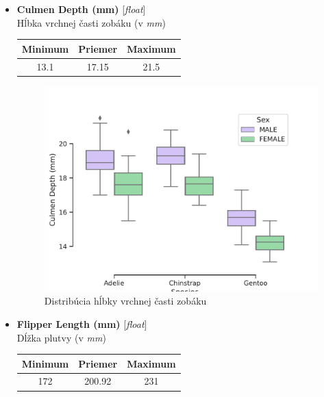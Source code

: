 \documentclass[a4paper, 16pt]{article}
\begin{document}
\begin{itemize}
    \item \textbf{Culmen Depth (mm)} [\emph{float}]\\
    Hĺbka vrchnej časti zobáku (v \emph{mm})
    \begin{table}[H]
        \centering
        \begin{tabular}{|c|c|c|}
        \hline
        \textbf{Minimum} & \textbf{Priemer} & \textbf{Maximum} \\ \hline
                          13.1    &      17.15            &   21.5                    \\ \hline
        \end{tabular}
    \end{table}
    
    \begin{figure}[H]
    \centering
    \includegraphics[width=15cm]{graphs/culmen_d.pdf}
    \caption{Distribúcia hĺbky vrchnej časti zobáku}
    \label{fig:2}
    \end{figure}
    
    
    \newpage
    
    
    \item \textbf{Flipper Length (mm)} [\emph{float}]\\
    Dĺžka plutvy (v \emph{mm})
    \begin{table}[H]
    \centering
    \begin{tabular}{|c|c|c|}
    \hline
    \textbf{Minimum} & \textbf{Priemer} & \textbf{Maximum} \\ \hline
                  172        &        200.92          &  231                     \\ \hline
    \end{tabular}
    \end{table}
    

\end{itemize}
\end{document}
